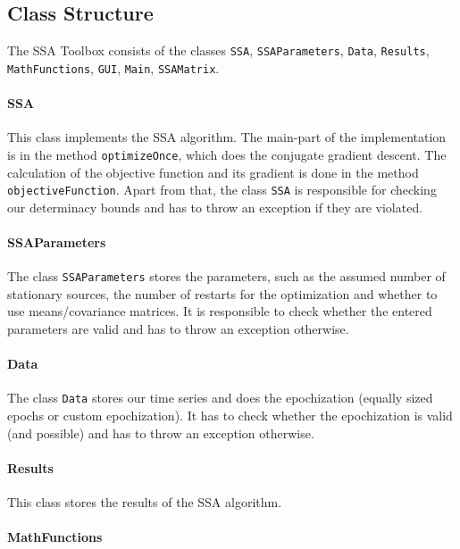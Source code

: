 \documentclass{article}
\newcommand{\1}{\ensuremath{\mathds{1}}}
\newcommand{\0}{\ensuremath{0}}
\begin{document}
\subsection*{Class Structure}

The SSA Toolbox consists of the classes \texttt{SSA}, \texttt{SSAParameters}, \texttt{Data}, \texttt{Results}, \texttt{MathFunctions}, 
\texttt{GUI}, \texttt{Main}, \texttt{SSAMatrix}.

\paragraph{SSA} 

This class implements the SSA algorithm. The main-part of the implementation is in the method \texttt{optimizeOnce}, which does
the conjugate gradient descent. The calculation of the objective function and its gradient is done in the method \texttt{objectiveFunction}.
Apart from that, the class \texttt{SSA} is responsible for checking our determinacy bounds and has to throw an exception if they are violated.

\paragraph{SSAParameters}

The class \texttt{SSAParameters} stores the parameters, such as the assumed number of stationary sources, the number of restarts for the optimization and
whether to use means/covariance matrices. It is responsible to check whether the entered parameters are valid and has to throw an exception otherwise.

\paragraph{Data}

The class \texttt{Data} stores our time series and does the epochization (equally sized epochs or custom epochization). It has to check whether the
epochization is valid (and possible) and has to throw an exception otherwise.

\paragraph{Results}

This class stores the results of the SSA algorithm.

\paragraph{MathFunctions}
\end{document}
